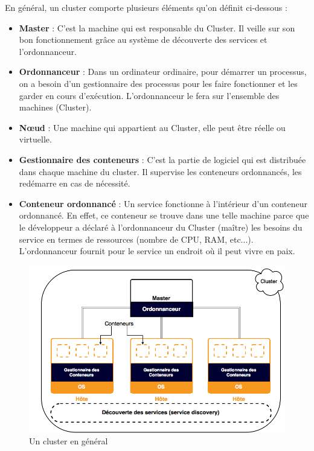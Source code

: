 \begin{onehalfspace}
{\begin{center}
\begin{table}[H]
\end{table}
\end{center}
}


En général, un cluster comporte plusieurs éléments qu'on définit ci-dessous \cite{cluster-scheduling}:

\begin{itemize}
	\item \textbf{Master} : C'est la machine qui est responsable du Cluster. Il veille sur son bon fonctionnement grâce au système de découverte des services et l'ordonnanceur.
	\item \textbf{Ordonnanceur} : Dans un ordinateur ordinaire, pour démarrer un processus, on a besoin d'un gestionnaire des processus pour les faire fonctionner et les garder en cours d'exécution. L'ordonnanceur le fera sur l'ensemble des machines (Cluster).
	\item \textbf{Nœud} : Une machine qui appartient au Cluster, elle peut être réelle ou virtuelle.
	\item \textbf{Gestionnaire des conteneurs} : C'est la partie de logiciel qui est distribuée dans chaque machine du cluster. Il supervise les conteneurs ordonnancés, les redémarre en cas de nécessité.
	\item \textbf{Conteneur ordonnancé} : Un service fonctionne à l'intérieur d'un conteneur ordonnancé. En effet, ce conteneur se trouve dans une telle machine  parce que le développeur a déclaré à l'ordonnanceur du Cluster (maître) les besoins du service en termes de ressources (nombre de CPU, RAM, etc...). L'ordonnanceur fournit pour le service un endroit où il peut vivre en paix.
\end{itemize}


\begin{figure}[H]
\centering
\includegraphics [scale=0.55]{chapitre3/assets/cluster}
\caption{Un cluster en général}
\label{fig:}
\end{figure}


\end{onehalfspace}
